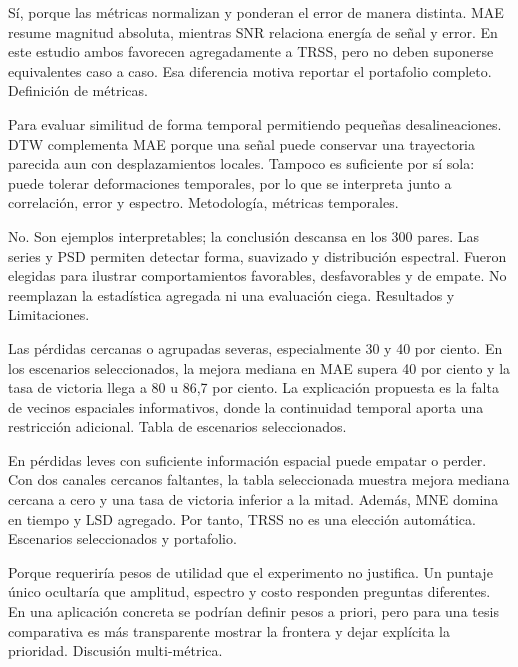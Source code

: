 {Sí, porque las métricas normalizan y ponderan el error de manera distinta.}
{MAE resume magnitud absoluta, mientras SNR relaciona energía de señal y error. En este estudio ambos favorecen agregadamente a TRSS, pero no deben suponerse equivalentes caso a caso. Esa diferencia motiva reportar el portafolio completo.}
{Definición de métricas.}

{Para evaluar similitud de forma temporal permitiendo pequeñas desalineaciones.}
{DTW complementa MAE porque una señal puede conservar una trayectoria parecida aun con desplazamientos locales. Tampoco es suficiente por sí sola: puede tolerar deformaciones temporales, por lo que se interpreta junto a correlación, error y espectro.}
{Metodología, métricas temporales.}

{No. Son ejemplos interpretables; la conclusión descansa en los 300 pares.}
{Las series y PSD permiten detectar forma, suavizado y distribución espectral. Fueron elegidas para ilustrar comportamientos favorables, desfavorables y de empate. No reemplazan la estadística agregada ni una evaluación ciega.}
{Resultados y Limitaciones.}

{Las pérdidas cercanas o agrupadas severas, especialmente 30 y 40 por ciento.}
{En los escenarios seleccionados, la mejora mediana en MAE supera 40 por ciento y la tasa de victoria llega a 80 u 86,7 por ciento. La explicación propuesta es la falta de vecinos espaciales informativos, donde la continuidad temporal aporta una restricción adicional.}
{Tabla de escenarios seleccionados.}

{En pérdidas leves con suficiente información espacial puede empatar o perder.}
{Con dos canales cercanos faltantes, la tabla seleccionada muestra mejora mediana cercana a cero y una tasa de victoria inferior a la mitad. Además, MNE domina en tiempo y LSD agregado. Por tanto, TRSS no es una elección automática.}
{Escenarios seleccionados y portafolio.}

{Porque requeriría pesos de utilidad que el experimento no justifica.}
{Un puntaje único ocultaría que amplitud, espectro y costo responden preguntas diferentes. En una aplicación concreta se podrían definir pesos a priori, pero para una tesis comparativa es más transparente mostrar la frontera y dejar explícita la prioridad.}
{Discusión multi-métrica.}


